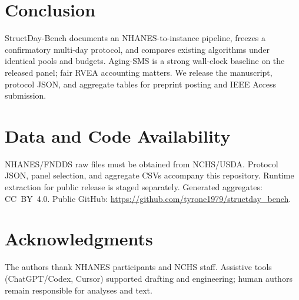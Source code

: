 \documentclass{ieeeaccess}
\begin{document}
\section{Conclusion}
StructDay-Bench documents an NHANES-to-instance pipeline, freezes a confirmatory multi-day protocol, and compares existing algorithms under identical pools and budgets. Aging-SMS is a strong wall-clock baseline on the released panel; fair RVEA accounting matters. We release the manuscript, protocol JSON, and aggregate tables for preprint posting and IEEE Access submission.

\section*{Data and Code Availability}
NHANES/FNDDS raw files must be obtained from NCHS/USDA. Protocol JSON, panel selection, and aggregate CSVs accompany this repository. Runtime extraction for public release is staged separately. Generated aggregates: CC~BY~4.0. Public GitHub: \url{https://github.com/tyrone1979/structday_bench}.

\section*{Acknowledgments}
The authors thank NHANES participants and NCHS staff. Assistive tools (ChatGPT/Codex, Cursor) supported drafting and engineering; human authors remain responsible for analyses and text.
\end{document}
